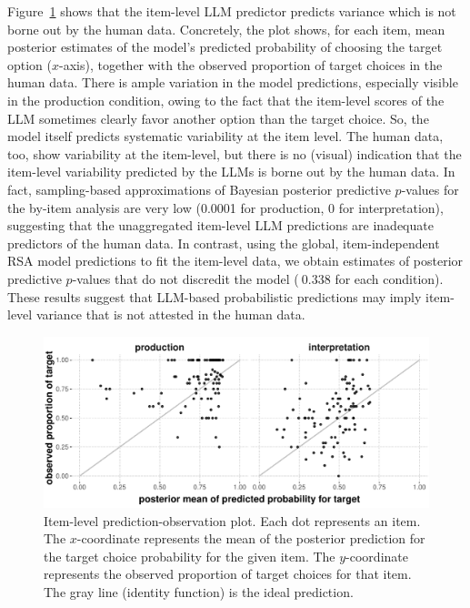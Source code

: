 \documentclass[fleqn]{article}
\begin{document}
Figure~\ref{fig:item-level-obs-pred} shows that the item-level LLM predictor predicts variance which is not borne out by the human data.
Concretely, the plot shows, for each item, mean posterior estimates of the model's predicted probability of choosing the target option ($x$-axis), together with the observed proportion of target choices in the human data.
There is ample variation in the model predictions, especially visible in the production condition, owing to the fact that the item-level scores of the LLM sometimes clearly favor another option than the target choice.
So, the model itself predicts systematic variability at the item level.
The human data, too, show variability at the item-level, but there is no (visual) indication that the item-level variability predicted by the LLMs is borne out by the human data.
In fact, sampling-based approximations of Bayesian posterior predictive $p$-values for the by-item analysis are very low (0.0001 for production, 0 for interpretation), suggesting that the unaggregated item-level LLM predictions are inadequate predictors of the human data.
In contrast, using the global, item-independent RSA model predictions to fit the item-level data, we obtain estimates of posterior predictive $p$-values that do not discredit the model ($~0.338$ for each condition).
These results suggest that LLM-based probabilistic predictions may imply item-level variance that is not attested in the human data.

\begin{figure}
  \centering

  \includegraphics[width = 0.9\linewidth]{00-pics/item-combined-obs-pred.pdf}

  \caption{
    Item-level prediction-observation plot.
    Each dot represents an item.
    The $x$-coordinate represents the mean of the posterior prediction for the target choice probability for the given item.
    The $y$-coordinate represents the observed proportion of target choices for that item.
    The gray line (identity function) is the ideal prediction.
  }
  \label{fig:item-level-obs-pred}
\end{figure}
\end{document}
